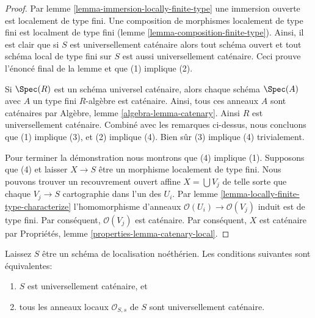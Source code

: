 \begin{proof}
Par lemme \ref{lemma-immersion-locally-finite-type} une immersion ouverte est localement de type fini. Une composition de morphismes localement de type fini est localment de type fini (lemme \ref{lemma-composition-finite-type}). Ainsi, il est clair que si $S$ est universellement caténaire alors tout schéma ouvert et tout schéma local de type fini sur $S$ est aussi universellement caténaire. Ceci prouve l'énoncé final de la lemme et que (1) implique (2).

\medskip\noindent
Si $\Spec(R)$ est un schéma universel caténaire, alors chaque schéma $\Spec(A)$ avec $A$ un type fini $R$-algèbre est caténaire. Ainsi, tous ces anneaux $A$ sont caténaires par Algèbre, lemme \ref{algebra-lemma-catenary}. Ainsi $R$ est universellement caténaire. Combiné avec les remarques ci-dessus, nous concluons que (1) implique (3), et (2) implique (4). Bien sûr (3) implique (4) trivialement.

\medskip\noindent
Pour terminer la démonstration nous montrons que (4) implique (1). Supposons que (4) et laisser $X \to S$ être un morphisme localement de type fini. Nous pouvons trouver un recouvrement ouvert affine $X = \bigcup V_j$ de telle sorte que chaque $V_j \to S$ cartographie dans l'un des $U_i$. Par lemme \ref{lemma-locally-finite-type-characterize} l'homomorphisme d'anneaux $\mathcal{O}(U_i) \to \mathcal{O}(V_j)$ induit est de type fini. Par conséquent, $\mathcal{O}(V_j)$ est caténaire. Par conséquent, $X$ est caténaire par Propriétés, lemme \ref{properties-lemma-catenary-local}.
\end{proof}

\begin{lemma}

\label{lemma-universally-catenary-local-rings-universally-catenary}
Laissez $S$ être un schéma de localisation noéthérien. Les conditions suivantes sont équivalentes:
\begin{enumerate}
\item $S$ est universellement caténaire, et
\item tous les anneaux locaux $\mathcal{O}_{S, s}$ de $S$ sont universellement caténaire.
\end{enumerate}

\end{lemma}

